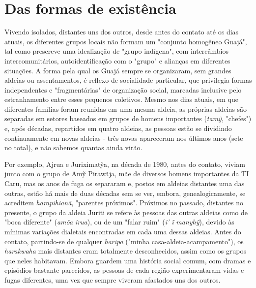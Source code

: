 \section{Das formas de existência}\label{das-formas-de-existuxeancia}

Vivendo isolados, distantes uns dos outros, desde antes do contato até
os dias atuais, os diferentes grupos locais não formam um "conjunto
homogêneo Guajá", tal como prescreve uma idealização de "grupo
indígena", com intercâmbios intercomunitários, autoidentificação com o
"grupo" e alianças em diferentes situações. A forma pela qual os Guajá
sempre se organizaram, sem grandes aldeias ou assentamentos, é reflexo
de socialidade particular, que privilegia formas independentes e
"fragmentárias" de organização social, marcadas inclusive pelo
estranhamento entre esses pequenos coletivos. Mesmo nos dias atuais, em
que diferentes famílias foram reunidas em uma mesma aldeia, as próprias
aldeias são separadas em setores baseados em grupos de homens
importantes (\emph{tamỹ}, "chefes") e, após décadas, repartidos em
quatro aldeias, as pessoas estão se dividindo continuamente em novas
aldeias - três novas apareceram nos últimos anos (sete no total), e não
sabemos quantas ainda virão.

Por exemplo, Ajrua e Juriximatỹa, na década de 1980, antes do contato,
viviam junto com o grupo de Amỹ Pirawãja, mãe de diversos homens
importantes da TI Caru, mas os anos de fuga os separaram e, postos em
aldeias distantes uma das outras, estão há mais de duas décadas sem se
ver, embora, genealogicamente, se acreditem \emph{harapihianã},
"parentes próximos". Próximos no passado, distantes no presente, o grupo
da aldeia Juriti se refere às pessoas das outras aldeias como de "boca
diferente" (\emph{amõa} \emph{irua}), ou de um "falar ruim" (\emph{i' ĩ}
\emph{manyhỹ}), devido às mínimas variações dialetais encontradas em
cada uma dessas aldeias. Antes do contato, partindo-se de qualquer
\emph{haripa} ("minha casa-aldeia-acampamento"), os \emph{harakwaha}
mais distantes eram totalmente desconhecidos, assim como os grupos que
neles habitavam. Embora guardem uma história social comum, com dramas e
episódios bastante parecidos, as pessoas de cada região experimentaram
vidas e fugas diferentes, uma vez que sempre viveram afastados uns dos
outros.


